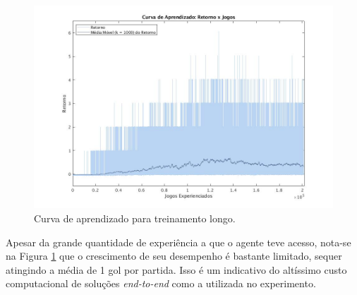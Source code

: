 \begin{figure}[h]
	\includegraphics[width=0.9\linewidth]{figs/curvalonga-qtabular.jpg}
	\centering
	\caption{Curva de aprendizado para treinamento longo.}
	\label{fig:single-agent-curvalonga}
\end{figure}

Apesar da grande quantidade de experiência a que o agente teve acesso, nota-se na Figura \ref{fig:single-agent-curvalonga} que o crescimento de seu desempenho é bastante limitado, sequer atingindo a média de 1 gol por partida. Isso é um indicativo do altíssimo custo computacional de soluções \textit{end-to-end} como a utilizada no experimento.


 


